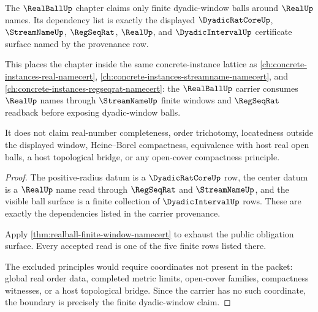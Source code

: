 \begin{theorem}
\label{thm:realball-standard-obligation-boundary}
The $\RealBallUp$ chapter claims only finite dyadic-window balls around $\RealUp$ names. Its dependency list is exactly the displayed $\DyadicRatCoreUp$, $\StreamNameUp$, $\RegSeqRat$, $\RealUp$, and $\DyadicIntervalUp$ certificate surface named by the provenance row.

This places the chapter inside the same concrete-instance lattice as \autoref{ch:concrete-instances-real-namecert}, \autoref{ch:concrete-instances-streamname-namecert}, and \autoref{ch:concrete-instances-regseqrat-namecert}: the $\RealBallUp$ carrier consumes $\RealUp$ names through $\StreamNameUp$ finite windows and $\RegSeqRat$ readback before exposing dyadic-window balls.

It does not claim real-number completeness, order trichotomy, locatedness outside the displayed window, Heine--Borel compactness, equivalence with host real open balls, a host topological bridge, or any open-cover compactness principle.
\end{theorem}
\begin{proof}
The positive-radius datum is a $\DyadicRatCoreUp$ row, the center datum is a $\RealUp$ name read through $\RegSeqRat$ and $\StreamNameUp$, and the visible ball surface is a finite collection of $\DyadicIntervalUp$ rows. These are exactly the dependencies listed in the carrier provenance.

Apply \autoref{thm:realball-finite-window-namecert} to exhaust the public obligation surface. Every accepted read is one of the five finite rows listed there.

The excluded principles would require coordinates not present in the packet: global real order data, completed metric limits, open-cover families, compactness witnesses, or a host topological bridge. Since the carrier has no such coordinate, the boundary is precisely the finite dyadic-window claim.
\end{proof}

